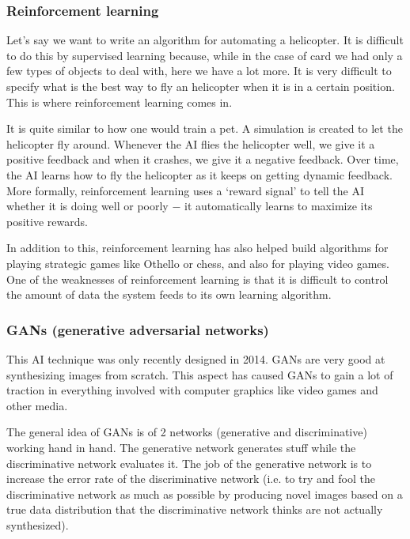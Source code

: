 \documentclass{article}[a4paper,12pt]
\theoremstyle{definition}
\begin{document}
\subsubsection{Reinforcement learning}
Let's say we want to write an algorithm for automating a helicopter. It is difficult to do this by supervised learning because, while in the case of card we had only a few types of objects to deal with, here we have a lot more. It is very difficult to specify what is the best way to fly an helicopter when it is in a certain position. This is where reinforcement learning comes in.
\vspace{6pt}

It is quite similar to how one would train a pet. A simulation is created to let the helicopter fly around. Whenever the AI flies the helicopter well, we give it a positive feedback and when it crashes, we give it a negative feedback. Over time, the AI learns how to fly the helicopter as it keeps on getting dynamic feedback. More formally, reinforcement learning uses a `reward signal' to tell the AI whether it is doing well or poorly $-$ it automatically learns to maximize its positive rewards.
\vspace{6pt}

In addition to this, reinforcement learning has also helped build algorithms for playing strategic games like Othello or chess, and also for playing video games. One of the weaknesses of reinforcement learning is that it is difficult to control the amount of data the system feeds to its own learning algorithm.
\subsubsection{GANs (generative adversarial networks)}
This AI technique was only recently designed in 2014. GANs are very good at synthesizing images from scratch. This aspect has caused GANs to gain a lot of traction in everything involved with computer graphics like video games and other media.
\vspace{6pt}

The general idea of GANs is of 2 networks (generative and discriminative) working hand in hand. The generative network generates stuff while the discriminative network evaluates it. The job of the generative network is to increase the error rate of the discriminative network (i.e. to try and fool the discriminative network as much as possible by producing novel images based on a true data distribution that the discriminative network thinks are not actually synthesized).
\end{document}
